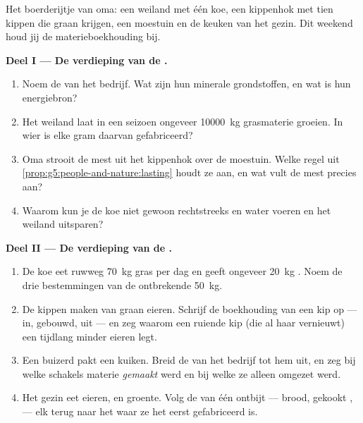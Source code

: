 \begin{problem}\label{pb:g6:matter-from-food:1}
Het boerderijtje van oma: een weiland met één koe, een kippenhok met tien
kippen die graan krijgen, een moestuin en de keuken van het gezin. Dit
weekend houd jij de materieboekhouding bij.

\medskip\noindent\textbf{Deel I --- De verdieping van de .}
\begin{enumerate}
  \item Noem de  van het bedrijf. Wat zijn hun minerale
        grondstoffen, en wat is hun energiebron?
  \item Het weiland laat in een seizoen ongeveer \qty{10000}{kg}
        grasmaterie groeien. In wier  is elke gram daarvan
        gefabriceerd?
  \item Oma strooit de mest uit het kippenhok over de moestuin. Welke
        regel uit \cref{prop:g5:people-and-nature:lasting} houdt ze aan,
        en wat vult de mest precies aan?
  \item Waarom kun je de koe niet gewoon rechtstreeks  en
        water voeren en het weiland uitsparen?
\end{enumerate}

\medskip\noindent\textbf{Deel II --- De verdieping van de .}
\begin{enumerate}[resume]
  \item De koe eet ruwweg \qty{70}{kg} gras per dag en geeft ongeveer
        \qty{20}{kg} . Noem de drie bestemmingen van de ontbrekende
        \qty{50}{kg}.
  \item De kippen maken van graan eieren. Schrijf de boekhouding van een
        kip op --- in, gebouwd, uit --- en zeg waarom een ruiende kip
        (die al haar  vernieuwt) een tijdlang minder eieren legt.
  \item Een buizerd pakt een kuiken. Breid de  van het
        bedrijf tot hem uit, en zeg bij welke schakels materie
        \emph{gemaakt} werd en bij welke ze alleen omgezet werd.
  \item Het gezin eet eieren,  en groente. Volg de 
        van één ontbijt --- brood, gekookt ,  --- elk terug naar
        het  waar ze het eerst gefabriceerd is.
\end{enumerate}


\end{problem}
